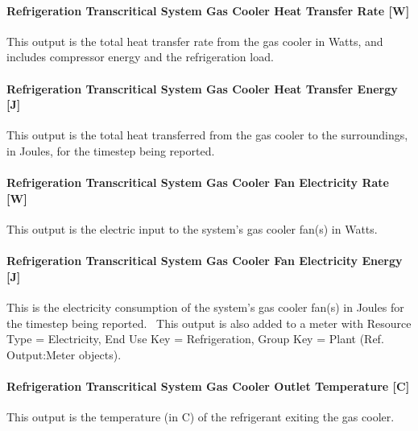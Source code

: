 \paragraph{Refrigeration Transcritical System Gas Cooler Heat Transfer Rate {[}W{]}}\label{refrigeration-transcritical-system-gas-cooler-heat-transfer-rate-w}

This output is the total heat transfer rate from the gas cooler in Watts, and includes compressor energy and the refrigeration load.

\paragraph{Refrigeration Transcritical System Gas Cooler Heat Transfer Energy {[}J{]}}\label{refrigeration-transcritical-system-gas-cooler-heat-transfer-energy-j}

This output is the total heat transferred from the gas cooler to the surroundings, in Joules, for the timestep being reported.

\paragraph{Refrigeration Transcritical System Gas Cooler Fan Electricity Rate {[}W{]}}\label{refrigeration-transcritical-system-gas-cooler-fan-electric-power-w}

This output is the electric input to the system's gas cooler fan(s) in Watts.

\paragraph{Refrigeration Transcritical System Gas Cooler Fan Electricity Energy {[}J{]}}\label{refrigeration-transcritical-system-gas-cooler-fan-electric-energy-j}

This is the electricity consumption of the system's gas cooler fan(s) in Joules for the timestep being reported.~ This output is also added to a meter with Resource Type = Electricity, End Use Key = Refrigeration, Group Key = Plant (Ref. Output:Meter objects).

\paragraph{Refrigeration Transcritical System Gas Cooler Outlet Temperature {[}C{]}}\label{refrigeration-transcritical-system-gas-cooler-outlet-temperature-c}

This output is the temperature (in C) of the refrigerant exiting the gas cooler.

